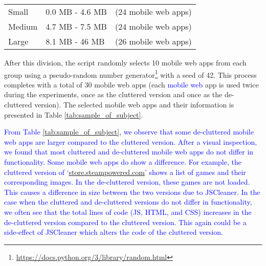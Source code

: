 \textcolor{blue}{
\begin{tabular}{lll}
Small & 0.0 MB - 4.6 MB & (24 mobile web apps)\\
Medium & 4.7 MB - 7.5 MB & (24 mobile web apps)\\
Large & 8.1 MB - 46 MB & (26 mobile web apps) 
\end{tabular}
}

After this division, the script randomly selects 10 mobile web apps from each group using a pseudo-random number generator\footnote{\url{https://docs.python.org/3/library/random.html}} with a seed of 42. This process completes with a total of 30 mobile web apps (each \textcolor{blue}{mobile web} app is used twice during the experiments, once as the cluttered version and once as the de-cluttered version). The selected mobile web apps and their information is presented in Table \ref{tab:sample_of_subject}.

\textcolor{blue}{From Table \ref{tab:sample_of_subject}, we observe that some de-cluttered mobile web apps are larger compared to the cluttered version. After a visual inspection, we found that most cluttered and de-cluttered mobile web apps do not differ in functionality. Some mobile web apps do show a difference. For example, the cluttered version of `\url{store.steampowered.com}' shows a list of games and their corresponding images. In the de-cluttered version, these games are not loaded. This causes a difference in size between the two versions due to JSCleaner. In the case when the cluttered and de-cluttered versions do not differ in functionality, we often see that the total lines of code (JS, HTML, and CSS) increases in the de-cluttered version compared to the cluttered version. This again could be a side-effect of JSCleaner which alters the code of the cluttered version.}

